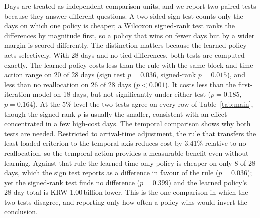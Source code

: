 \documentclass[a4paper]{llncs}
\begin{document}
\noindent
Days are treated as
independent comparison units, and we report two paired tests because
they answer different questions. A two-sided sign test counts only the
days on which one policy is cheaper; a Wilcoxon signed-rank test ranks
the differences by magnitude first, so a policy that wins on fewer days
but by a wider margin is scored differently. The distinction matters
because the learned policy acts selectively. With 28 days
and no tied differences, both tests are computed exactly.
The learned policy costs less than the rule with the same
block-and-time action range on 20 of 28 days (sign test $p=0.036$,
signed-rank $p=0.015$), and less than no reallocation on 26 of 28 days
($p<0.001$). It costs less than the first-iteration model on 18 days,
but not significantly under either test ($p=0.185$, $p=0.164$). At the 5\% level the two tests agree on every
row of Table~\ref{tab:main}, though the signed-rank $p$ is usually the
smaller, consistent with an effect concentrated in a few high-cost days.
The temporal comparison shows why both tests are needed.
Restricted to arrival-time adjustment, the rule that transfers the
least-loaded criterion to the temporal axis reduces cost by 3.41\%
relative to no reallocation, so the temporal action provides a
measurable benefit even without learning. Against that rule the learned
time-only policy is cheaper on only 8 of 28 days, which the sign test
reports as a difference in favour of the rule ($p=0.036$); yet the
signed-rank test finds no difference ($p=0.399$) and the learned
policy's 28-day total is KRW 1.00\,billion lower. This is the one comparison
in which the two tests disagree, and reporting only how often a policy
wins would invert the conclusion.
\end{document}
